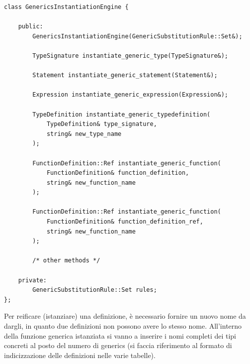 \vspace{0.5cm}
\begin{lstlisting}[frame=single]
class GenericsInstantiationEngine {

    public:
        GenericsInstantiationEngine(GenericSubstitutionRule::Set&);

        TypeSignature instantiate_generic_type(TypeSignature&);
       
        Statement instantiate_generic_statement(Statement&);
                
        Expression instantiate_generic_expression(Expression&);
        
        TypeDefinition instantiate_generic_typedefinition(
            TypeDefinition& type_signature,
            string& new_type_name
        );
        
        FunctionDefinition::Ref instantiate_generic_function(
            FunctionDefinition& function_definition,
            string& new_function_name
        );

        FunctionDefinition::Ref instantiate_generic_function(
            FunctionDefinition& function_definition_ref, 
            string& new_function_name
        );

        /* other methods */

    private:
        GenericSubstitutionRule::Set rules;
};
\end{lstlisting}
\vspace{0.5cm}

Per reificare (istanziare) una definizione, è necessario fornire un nuovo nome da dargli, in quanto 
due definizioni non possono avere lo stesso nome. All'interno della funzione generica istanziata 
si vanno a inserire i nomi completi dei tipi concreti al posto del numero di generics 
(si faccia riferimento al formato di indicizzazione delle definizioni nelle varie tabelle). \\

\newpage